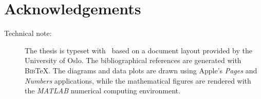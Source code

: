 \chapter*{Acknowledgements}





\null
\vfill
\begin{description}
\item [Technical note: ] The thesis is typeset with \LaTeXe \ based on a document layout provided by the University of Oslo. The bibliographical references are generated with \textsc{Bib}\negthinspace\TeX. The diagrams and data plots are drawn using Apple's \textit{Pages} and \textit{Numbers} applications, while the mathematical figures are rendered with the \textit{MATLAB} numerical computing environment.
\end{description}